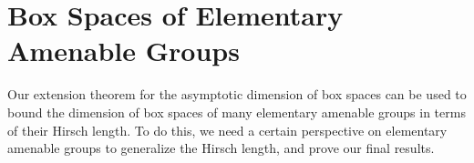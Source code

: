 \documentclass[12pt]{article}
\newcommand{\acts}{\curvearrowright}
\newcommand{\dad}{\text{DAD}}
\begin{document}
{%
%









\section{Box Spaces of Elementary Amenable Groups}
\normalfont Our extension theorem for the asymptotic dimension of box spaces can be used to bound the dimension of box spaces of many elementary amenable groups in terms of their Hirsch length.  To do this, we need a certain perspective on elementary amenable groups to generalize the Hirsch length, and prove our final results.  

}
\end{document}
